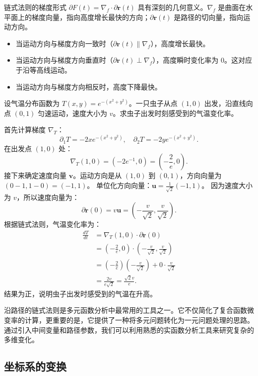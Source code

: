\documentclass[12pt,UTF8]{ctexbook}
\begin{document}
链式法则的梯度形式 $\partial F(t) = \nabla_f \cdot \partial\mathbf{r}(t)$ 具有深刻的几何意义。$\nabla_f$ 是曲面在水平面上的梯度向量，指向高度增长最快的方向；$\partial\mathbf{r}(t)$ 是路径的切向量，指向运动方向。
\begin{itemize}
\item 当运动方向与梯度方向一致时（$\partial\mathbf{r}(t) \parallel \nabla_f$），高度增长最快。
\item 当运动方向与梯度方向垂直时（$\partial\mathbf{r}(t) \perp \nabla_f$），高度瞬时变化率为 0。这对应于沿等高线运动。
\item 当运动方向与梯度方向相反时，高度下降最快。
\end{itemize}

\begin{et}
设气温分布函数为 $T(x, y) = e^{-(x^2 + y^2)}$。一只虫子从点 $(1, 0)$ 出发，沿直线向点 $(0, 1)$ 匀速运动，速度大小为 $v$。求虫子出发时刻感受到的气温变化率。
\end{et}
\begin{so}
首先计算梯度 $\nabla_T$：
$$ \partial_1 T = -2x e^{-(x^2 + y^2)}, \quad \partial_2 T = -2y e^{-(x^2 + y^2)}. $$
在出发点 $(1, 0)$ 处：
$$ \nabla_T(1, 0) = (-2e^{-1}, 0) = \left(-\frac{2}{e}, 0\right). $$
接下来确定速度向量 $\mathbf{v}$。运动方向是从 $(1, 0)$ 到 $(0, 1)$，方向向量为 $(0-1, 1-0) = (-1, 1)$。
单位化方向向量：$\mathbf{u} = \frac{1}{\sqrt{2}}(-1, 1)$。
因为速度大小为 $v$，所以速度向量为：
$$ \partial \mathbf{r}(0) = v \mathbf{u} = \left(-\frac{v}{\sqrt{2}}, \frac{v}{\sqrt{2}}\right). $$
根据链式法则，气温变化率为：
\begin{align*}
\frac{dT}{dt} &= \nabla_T(1, 0) \cdot \partial \mathbf{r}(0) \\
&= \left(-\frac{2}{e}, 0\right) \cdot \left(-\frac{v}{\sqrt{2}}, \frac{v}{\sqrt{2}}\right) \\
&= \left(-\frac{2}{e}\right)\left(-\frac{v}{\sqrt{2}}\right) + 0 \cdot \frac{v}{\sqrt{2}} \\
&= \frac{2v}{e\sqrt{2}} = \frac{\sqrt{2}v}{e}.
\end{align*}
结果为正，说明虫子出发时感受到的气温在升高。
\end{so}

沿路径的链式法则是多元函数分析中最常用的工具之一。它不仅简化了复合函数微变率的计算，更重要的是，它提供了一种将多元问题转化为一元问题处理的思路。通过引入中间变量和路径参数，我们可以利用熟悉的实函数分析工具来研究复杂的多维变化。

\subsection{坐标系的变换}
\end{document}
